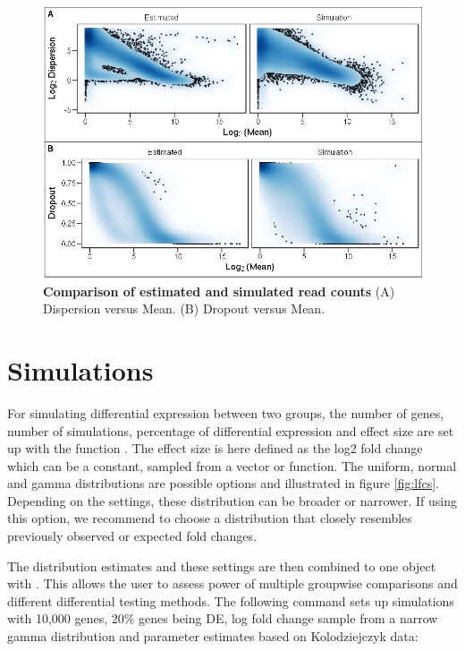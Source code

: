 \documentclass{article}\usepackage[]{graphicx}\usepackage[usenames,dvipsnames]{color}
\begin{document}
\begin{figure}[h]
\centering
\includegraphics[width=0.7\linewidth]{simeval.jpeg}
\caption{\textbf{Comparison of estimated and simulated read counts} (A) Dispersion versus Mean. (B) Dropout versus Mean.}
\label{fig:simeval}
\end{figure}

\section{Simulations}
For simulating differential expression between two groups, the number of genes, number of simulations, percentage of differential expression and effect size are set up with the function . The effect size is here defined as the log2 fold change which can be a constant, sampled from a vector or function. The uniform, normal and gamma distributions are possible options and illustrated in figure \ref{fig:lfcs}. Depending on the settings, these distribution can be broader or narrower. If using this option, we recommend to choose a distribution that closely resembles previously observed or expected fold changes.

The distribution estimates and these settings are then combined to one object with . This allows the user to assess power of multiple groupwise comparisons and different differential testing methods.
The following command sets up simulations with 10,000 genes, 20\% genes being DE, log fold change sample from a narrow gamma distribution and parameter estimates based on Kolodziejczyk data:
\end{document}
